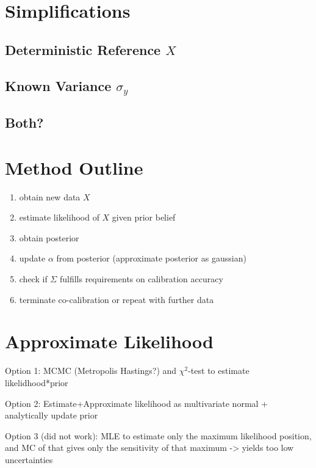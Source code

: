 \documentclass[10pt]{article}
\newcommand{\mat}[1]{#1}
\begin{document}
        
    \section{Simplifications}
    
    \subsection{Deterministic Reference $X$}
    
    \subsection{Known Variance $\sigma_y$}
    
    \subsection{Both?}
    
    
    \section{Method Outline}
    \begin{enumerate}
        \item obtain new data $X$
        \item estimate likelihood of $X$ given prior belief
        \item obtain posterior
        \item update $\alpha$ from posterior (approximate posterior as gaussian)
        \item check if $\mat{\Sigma}$ fulfills requirements on calibration accuracy
        \item terminate co-calibration or repeat with further data
    \end{enumerate}



    \section{Approximate Likelihood}
    
    Option 1: MCMC (Metropolis Hastings?) and $\chi^2$-test to estimate likelidhood*prior
    
    Option 2: Estimate+Approximate likelihood as multivariate normal + analytically update prior
    
    Option 3 (did not work): MLE to estimate only the maximum likelihood position, and MC of that gives only the sensitivity of that maximum -> yields too low uncertainties
    
    
    
    
\end{document}
